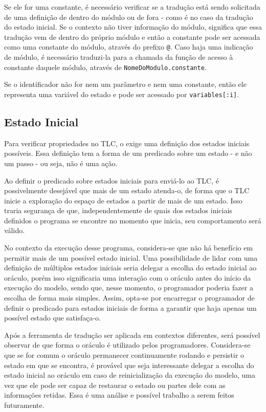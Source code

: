 Se ele for uma constante, é necessário verificar se a tradução está
sendo solicitada de uma definição de dentro do módulo ou de fora - como é no
caso da tradução do estado inicial. Se o contexto não tiver informação do
módulo, significa que essa tradução vem de dentro do próprio módulo e então a
constante pode ser acessada como uma constante do módulo, através do prefixo
\texttt{@}. Caso haja uma indicação de módulo, é necessário traduzi-la para a
chamada da função de acesso à constante daquele módulo, através de
\texttt{NomeDoModulo.constante}.

Se o identificador não for nem um parâmetro e nem uma constante, então ele
representa uma variável do estado e pode ser acessado por \texttt{variables[:i]}.

\subsection{Estado Inicial}

Para verificar propriedades no TLC, o \TLA exige uma definição dos estados
iniciais possíveis. Essa definição tem a forma de um predicado sobre um estado
- e não um passo - ou seja, não é uma ação.

Ao definir o predicado sobre estados iniciais para enviá-lo ao TLC, é
possivelmente desejável que mais de um estado atenda-o, de forma que o TLC
inicie a exploração do espaço de estados a partir de mais de um estado. Isso
traria segurança de que, independentemente de quais dos estados iniciais definidos o
programa se encontre no momento que inicia, seu comportamento será válido.

No contexto da execução desse programa, considera-se que não há benefício em
permitir mais de um possível estado inicial. Uma possibilidade de lidar com uma
definição de múltiplos estados iniciais seria delegar a escolha do estado
inicial ao oráculo, porém isso significaria uma interação com o oráculo antes do
início da execução do modelo, sendo que, nesse momento, o programador poderia
fazer a escolha de forma mais simples. Assim, opta-se por encarregar o
programador de definir o predicado para estados iniciais de forma a garantir que
haja apenas um possível estado que satisfaça-o.

Após a ferramenta de tradução ser aplicada em contextos diferentes, será
possível observar de que forma o oráculo é utilizado pelos programadores.
Considera-se que se for comum o oráculo permanecer continuamente rodando e
persistir o estado em que se encontra, é provável que seja interessante delegar a
escolha do estado inicial ao oráculo em caso de reinicialização da execução do
modelo, uma vez que ele pode ser capaz de restaurar o estado ou partes dele com
as informações retidas. Essa é uma análise e possível trabalho a serem feitos
futuramente.

